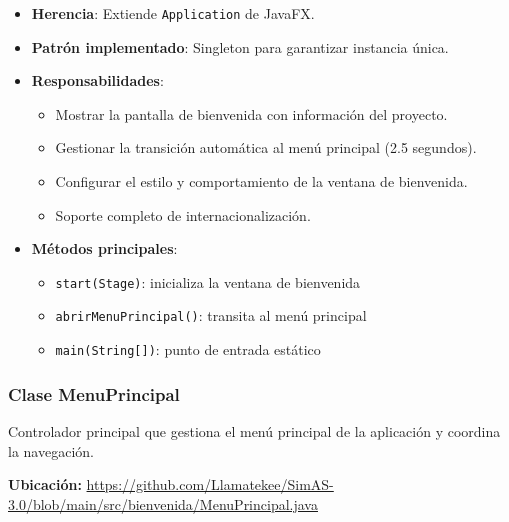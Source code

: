 \begin{itemize}
    \item \textbf{Herencia}: Extiende \texttt{Application} de JavaFX.
    \item \textbf{Patrón implementado}: Singleton para garantizar instancia única.
    \item \textbf{Responsabilidades}:
    \begin{itemize}
        \item Mostrar la pantalla de bienvenida con información del proyecto.
        \item Gestionar la transición automática al menú principal (2.5 segundos).
        \item Configurar el estilo y comportamiento de la ventana de bienvenida.
        \item Soporte completo de internacionalización.
    \end{itemize}
    \item \textbf{Métodos principales}:
    \begin{itemize}
        \item \texttt{start(Stage)}: inicializa la ventana de bienvenida
        \item \texttt{abrirMenuPrincipal()}: transita al menú principal
        \item \texttt{main(String[])}: punto de entrada estático
    \end{itemize}
\end{itemize}

\subsubsection{Clase MenuPrincipal}

Controlador principal que gestiona el menú principal de la aplicación y coordina la navegación.

\textbf{Ubicación:} \url{https://github.com/Llamatekee/SimAS-3.0/blob/main/src/bienvenida/MenuPrincipal.java}

